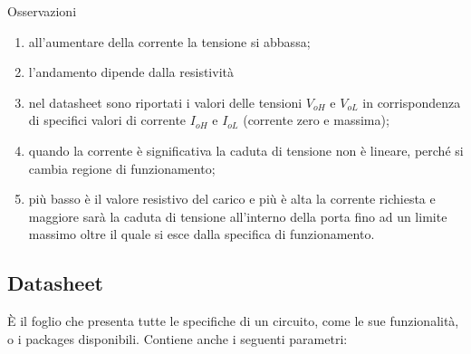 \documentclass[
]{book}
\begin{document}
\begin{redbox}{Osservazioni}
\begin{enumerate}
\item all'aumentare della corrente la tensione si abbassa;
\item l'andamento dipende dalla resistività
\item nel datasheet sono riportati i valori delle tensioni $V_{oH}$ e $V_{oL}$ in corrispondenza di specifici valori di corrente $I_{oH}$ e $I_{oL}$ (corrente zero e massima);
\item quando la corrente è significativa la caduta di tensione non è lineare, perché si cambia regione di funzionamento;
\item più basso è il valore resistivo del carico e più è alta la corrente richiesta e maggiore sarà la caduta di tensione all'interno della porta fino ad un limite massimo oltre il quale si esce dalla specifica di funzionamento.
\end{enumerate}
\end{redbox}

\subsection{Datasheet}\label{datasheet}

È il foglio che presenta tutte le specifiche di un circuito, come le sue
funzionalità, o i packages disponibili. Contiene anche i seguenti
parametri:
\end{document}
